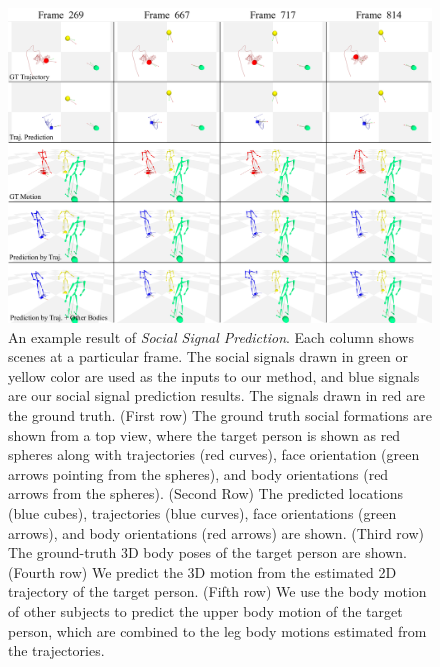\begin{figure}
	\centering       
	\includegraphics[width=\linewidth]{ssp_fig/qual_170221_b2_group4}
	\caption{An example result of \textit{Social Signal Prediction}. Each column shows scenes at a particular frame. The social signals drawn in green or yellow color are used as the inputs to our method, and blue signals are our social signal prediction results. The signals drawn in red are the ground truth. (First row) The ground truth social formations are shown from a top view, where the target person is shown as red spheres along with trajectories (red curves), face orientation (green arrows pointing from the spheres), and body orientations (red arrows from the spheres). (Second Row) The predicted locations (blue cubes), trajectories (blue curves), face orientations (green arrows), and body orientations (red arrows) are shown. (Third row) The ground-truth 3D body poses of the target person are shown. (Fourth row) We predict the 3D motion from the estimated 2D trajectory of the target person. (Fifth row) We use the body motion of other subjects to predict the upper body motion of the target person, which are combined to the leg body motions estimated from the trajectories.} 
	\label{fig:qualitative}
\end{figure}

